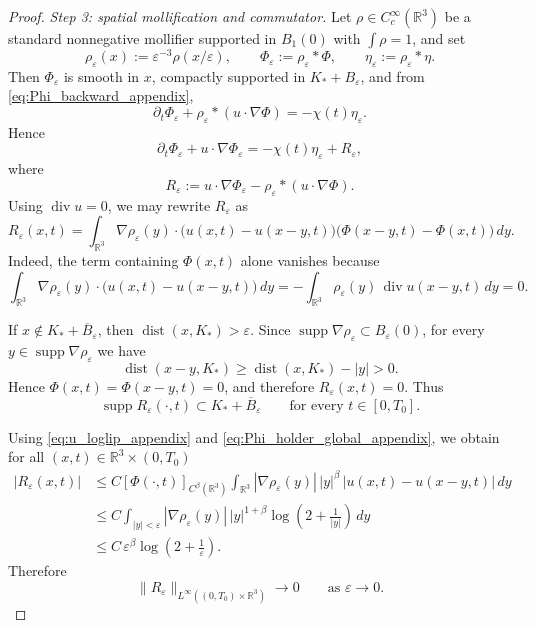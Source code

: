 \documentclass[10pt,a4paper]{amsart}
\newcommand{\supp}{\operatorname{supp}}
\begin{document}
\begin{proof}
\smallskip
\noindent\emph{Step 3: spatial mollification and commutator.}
Let $\rho\in C_c^\infty(\mathbb R^3)$ be a standard nonnegative mollifier supported in
$B_1(0)$ with $\int\rho=1$, and set
\[
\rho_\varepsilon(x):=\varepsilon^{-3}\rho(x/\varepsilon),
\qquad
\Phi_\varepsilon:=\rho_\varepsilon * \Phi,
\qquad
\eta_\varepsilon:=\rho_\varepsilon * \eta.
\]
Then $\Phi_\varepsilon$ is smooth in $x$, compactly supported in $K_*+B_\varepsilon$, and
from \eqref{eq:Phi_backward_appendix},
\[
\partial_t\Phi_\varepsilon+\rho_\varepsilon*(u\cdot\nabla\Phi)
=
-\chi(t)\eta_\varepsilon .
\]
Hence
\begin{equation}
\label{eq:Phi_eps_eq_appendix}
\partial_t\Phi_\varepsilon+u\cdot\nabla\Phi_\varepsilon
=
-\chi(t)\eta_\varepsilon+R_\varepsilon,
\end{equation}
where
\[
R_\varepsilon
:=
u\cdot\nabla\Phi_\varepsilon-\rho_\varepsilon*(u\cdot\nabla\Phi).
\]
Using $\operatorname{div}u=0$, we may rewrite $R_\varepsilon$ as
\[
R_\varepsilon(x,t)
=
\int_{\mathbb R^3}
\nabla\rho_\varepsilon(y)\cdot\bigl(u(x,t)-u(x-y,t)\bigr)
\bigl(\Phi(x-y,t)-\Phi(x,t)\bigr)\,dy .
\]
Indeed, the term containing $\Phi(x,t)$ alone vanishes because
\[
\int_{\mathbb R^3}\nabla\rho_\varepsilon(y)\cdot\bigl(u(x,t)-u(x-y,t)\bigr)\,dy
=
-\int_{\mathbb R^3}\rho_\varepsilon(y)\,\operatorname{div}u(x-y,t)\,dy
=0.
\]



If $x\notin K_*+\overline B_\varepsilon$, then $\operatorname{dist}(x,K_*)>\varepsilon$. Since
$\supp \nabla\rho_\varepsilon\subset B_\varepsilon(0)$, for every
$y\in\supp \nabla\rho_\varepsilon$ we have
\[
\operatorname{dist}(x-y,K_*)\ge \operatorname{dist}(x,K_*)-|y|>0.
\]
Hence $\Phi(x,t)=\Phi(x-y,t)=0$, and therefore $R_\varepsilon(x,t)=0$. Thus
\begin{equation}
\label{eq:R_eps_support_appendix}
\supp R_\varepsilon(\cdot,t)\subset K_*+\overline B_\varepsilon
\qquad\text{for every }t\in[0,T_0].
\end{equation}

Using \eqref{eq:u_loglip_appendix} and \eqref{eq:Phi_holder_global_appendix}, we obtain
for all $(x,t)\in\mathbb R^3\times(0,T_0)$
\begin{align*}
|R_\varepsilon(x,t)|
&\le
C[\Phi(\cdot,t)]_{C^\beta(\mathbb R^3)}
\int_{\mathbb R^3}
|\nabla\rho_\varepsilon(y)|\,|y|^\beta\,|u(x,t)-u(x-y,t)|\,dy \\
&\le
C\int_{|y|<\varepsilon}
|\nabla\rho_\varepsilon(y)|\,|y|^{1+\beta}
\log\!\left(2+\frac1{|y|}\right)\,dy \\
&\le
C\,\varepsilon^\beta\log\!\left(2+\frac1\varepsilon\right).
\end{align*}
Therefore
\begin{equation}
\label{eq:R_eps_to_zero_appendix}
\|R_\varepsilon\|_{L^\infty((0,T_0)\times\mathbb R^3)}
\longrightarrow 0
\qquad\text{as }\varepsilon\to 0.
\end{equation}




\end{proof}
\end{document}
